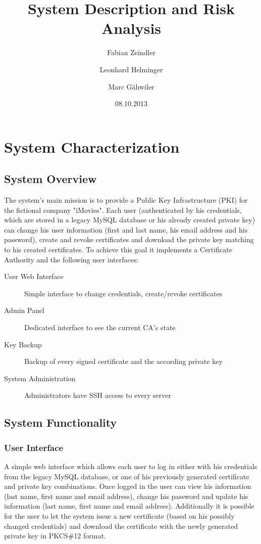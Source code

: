 \documentclass{article}
\title{\huge\sffamily\bfseries System Description and Risk Analysis}
\author{Fabian Zeindler \and Leonhard Helminger \and Marc Gähwiler}
\date{08.10.2013}
\begin{document}
\maketitle

\tableofcontents
\pagebreak


\section{System Characterization}

\subsection{System Overview}

The system's main mission is to provide a Public Key Infrastructure (PKI) for the fictional company "iMovies". Each user (authenticated by his credentials, which are stored in a legacy MySQL database or his already created private key) can change his user information (first and last name, his email address and his password), create and revoke certificates and download the private key matching to his created certificates. To achieve this goal it implements a Certificate Authority and the following user interfaces:

\begin{description}
\item[User Web Interface] Simple interface to change credentials, create/revoke certificates
\item[Admin Panel] Dedicated interface to see the current CA's state
\item[Key Backup] Backup of every signed certificate and the according private key
\item[System Administration] Administrators have SSH access to every server
\end{description}


\subsection{System Functionality}

\subsubsection{User Interface}

A simple web interface which allows each user to log in either with his credentials from the legacy MySQL database, or one of his previously generated certificate and private key combinations.
Once logged in the user can view his information (last name, first name and email address), change his password and update his information (last name, first name and email address).
Additionally it is possible for the user to let the system issue a new certificate (based on his possibly changed credentials) and download the certificate with the newly generated private key in PKCS\#12 format.
\end{document}

